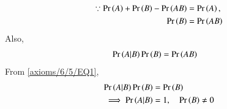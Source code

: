\begin{align}
\because   \Pr\left(A\right) + \Pr\left(B\right) - \Pr\left(AB\right) &= \Pr\left(A\right),
\\
  \Pr\left(B\right) &= \Pr\left(AB\right)\label{axioms/6/5/EQ1}
\end{align}
Also,
\begin{align}
    \Pr\left(A|B\right)\Pr\left(B\right) &= \Pr\left(AB\right)
\end{align}
From \eqref{axioms/6/5/EQ1},
\begin{align}
    \Pr\left(A|B\right)\Pr\left(B\right) &= \Pr\left(B\right)
    \\
    \implies \Pr\left(A|B\right) &= 1, \quad \Pr\left(B\right) \neq 0
\end{align}
    